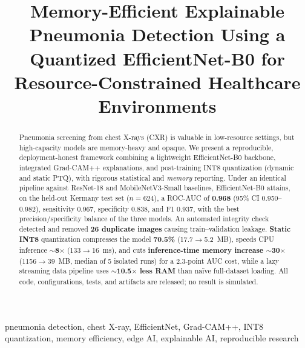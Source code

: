 \documentclass[conference]{IEEEtran}
\begin{document}
\title{Memory-Efficient Explainable Pneumonia Detection Using a Quantized
EfficientNet-B0 for Resource-Constrained Healthcare Environments}

\author{
}

\maketitle

\begin{abstract}
Pneumonia screening from chest X-rays (CXR) is valuable in low-resource settings, but
high-capacity models are memory-heavy and opaque. We present a reproducible,
deployment-honest framework combining a lightweight EfficientNet-B0 backbone,
integrated Grad-CAM++ explanations, and post-training INT8 quantization (dynamic and
static PTQ), with rigorous statistical and \emph{memory} reporting. Under an identical
pipeline against ResNet-18 and MobileNetV3-Small baselines, EfficientNet-B0 attains, on
the held-out Kermany test set ($n{=}624$), a ROC-AUC of \textbf{0.968} (95\% CI
0.950--0.982), sensitivity 0.967, specificity 0.838, and F1 0.937, with the best
precision/specificity balance of the three models. An automated integrity check
detected and removed \textbf{26 duplicate images} causing train--validation leakage.
\textbf{Static INT8} quantization compresses the model \textbf{70.5\%} (17.7$\rightarrow$5.2~MB),
speeds CPU inference \textbf{$\sim$8$\times$} (133$\rightarrow$16~ms), and cuts
\textbf{inference-time memory increase $\sim$30$\times$} (1156$\rightarrow$39~MB, median
of 5 isolated runs) for a 2.3-point AUC cost, while a lazy streaming data pipeline uses
\textbf{$\sim$10.5$\times$ less RAM} than naïve full-dataset loading. All code,
configurations, tests, and artifacts
are released; no result is simulated.
\end{abstract}

\begin{IEEEkeywords}
pneumonia detection, chest X-ray, EfficientNet, Grad-CAM++, INT8 quantization, memory
efficiency, edge AI, explainable AI, reproducible research
\end{IEEEkeywords}
\end{document}
